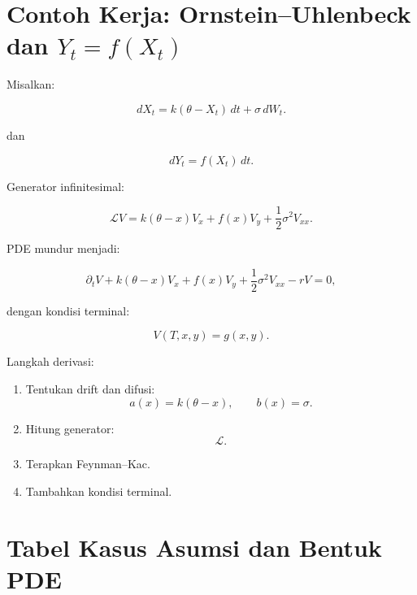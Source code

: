 \documentclass[12pt,a4paper]{article}
\begin{document}
\section{Contoh Kerja: Ornstein--Uhlenbeck dan $Y_t=f(X_t)$}

Misalkan:

\begin{equation}
dX_t
=
k(\theta-X_t)\,dt
+
\sigma\,dW_t.
\end{equation}

dan

\begin{equation}
dY_t=f(X_t)\,dt.
\end{equation}

Generator infinitesimal:

\begin{equation}
\mathcal LV
=
k(\theta-x)V_x
+
f(x)V_y
+
\frac12\sigma^2V_{xx}.
\end{equation}

PDE mundur menjadi:

\begin{equation}
\partial_tV
+
k(\theta-x)V_x
+
f(x)V_y
+
\frac12\sigma^2V_{xx}
-rV
=
0,
\end{equation}

dengan kondisi terminal:

\[
V(T,x,y)=g(x,y).
\]

Langkah derivasi:

\begin{enumerate}

\item Tentukan drift dan difusi:
\[
a(x)=k(\theta-x),
\qquad
b(x)=\sigma.
\]

\item Hitung generator:
\[
\mathcal L.
\]

\item Terapkan Feynman--Kac.

\item Tambahkan kondisi terminal.

\end{enumerate}

\section{Tabel Kasus Asumsi dan Bentuk PDE}
\end{document}
